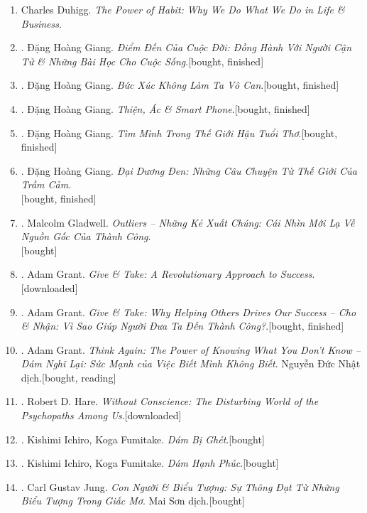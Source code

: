\documentclass{article}
\begin{document}
\begin{enumerate}
	\item Charles Duhigg. \textit{The Power of Habit: Why We Do What We Do in Life \& Business}.
	\item \cite{Giang2022a}. Đặng Hoàng Giang. \textit{Điểm Đến Của Cuộc Đời: Đồng Hành Với Người Cận Tử \& Những Bài Học Cho Cuộc Sống}.\hfill\textsf{[bought, finished]}
	\item \cite{Giang2022b}. Đặng Hoàng Giang. \textit{Bức Xúc Không Làm Ta Vô Can}.\hfill\textsf{[bought, finished]}
	\item \cite{Giang2022c}. Đặng Hoàng Giang. \textit{Thiện, Ác \& Smart Phone}.\hfill\textsf{[bought, finished]}
	\item \cite{Giang2022d}. Đặng Hoàng Giang. \textit{Tìm Mình Trong Thế Giới Hậu Tuổi Thơ}.\hfill\textsf{[bought, finished]}
	\item \cite{Giang2023}. Đặng Hoàng Giang. \textit{Đại Dương Đen: Những Câu Chuyện Từ Thế Giới Của Trầm Cảm}.\\\mbox{}\hfill\textsf{[bought, finished]}
	\item \cite{Gladwell2022}. Malcolm Gladwell. \textit{Outliers -- Những Kẻ Xuất Chúng: Cái Nhìn Mới Lạ Về Nguồn Gốc Của Thành Công}.\\\mbox{}\hfill\textsf{[bought]}
	\item \cite{Grant2013}. Adam Grant. \textit{Give \& Take: A Revolutionary Approach to Success}.\hfill\textsf{[downloaded]}
	\item \cite{Grant2020}. Adam Grant. \textit{Give \& Take: Why Helping Others Drives Our Success -- Cho \& Nhận: Vì Sao Giúp Người Đưa Ta Đến Thành Công?}.\hfill\textsf{[bought, finished]}
	\item \cite{Grant2022}. Adam Grant. \textit{Think Again: The Power of Knowing What You Don't Know -- Dám Nghĩ Lại: Sức Mạnh của Việc Biết Mình Không Biết}. Nguyễn Đức Nhật dịch.\hfill\textsf{[bought, reading]}
	\item \cite{Hare1999}. Robert D. Hare. \textit{Without Conscience: The Disturbing World of the Psychopaths Among Us}.\hfill\textsf{[downloaded]}
	\item \cite{Ichiro_Fumitake2022a}. Kishimi Ichiro, Koga Fumitake. \textit{Dám Bị Ghét}.\hfill\textsf{[bought]}
	\item \cite{Ichiro_Fumitake2022b}. Kishimi Ichiro, Koga Fumitake. \textit{Dám Hạnh Phúc}.\hfill\textsf{[bought]}
	\item \cite{Jung2022}. Carl Gustav Jung. \textit{Con Người \& Biểu Tượng: Sự Thông Đạt Từ Những Biểu Tượng Trong Giấc Mơ}. Mai Sơn dịch.\hfill\textsf{[bought]}

\end{enumerate}
\end{document}
